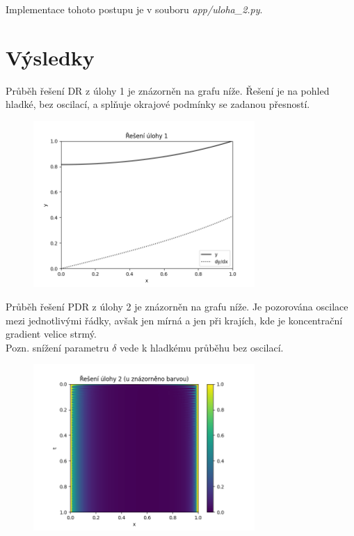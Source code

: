 \documentclass[a4paper,12pt]{article}
\begin{document}
Implementace tohoto postupu je v souboru \textit{app/uloha\_2.py}.



\newpage
\section*{Výsledky}
Průběh řešení DR z úlohy 1 je znázorněn na grafu níže.
Řešení je na pohled hladké, bez oscilací, a splňuje okrajové podmínky se zadanou přesností.
\begin{figure}[H]
\begin{center}
	\includegraphics[width=0.75\textwidth]{uloha_1.png}
\end{center}
\end{figure}

Průběh řešení PDR z úlohy 2 je znázorněn na grafu níže.
Je pozorována oscilace mezi jednotlivými řádky, avšak jen mírná a jen při krajích, kde je koncentrační gradient velice strmý. \\
Pozn. snížení parametru $\delta$ vede k hladkému průběhu bez oscilací.
\begin{figure}[H]
\begin{center}
	\includegraphics[width=0.75\textwidth]{uloha_2.png}
\end{center}
\end{figure}
\end{document}
